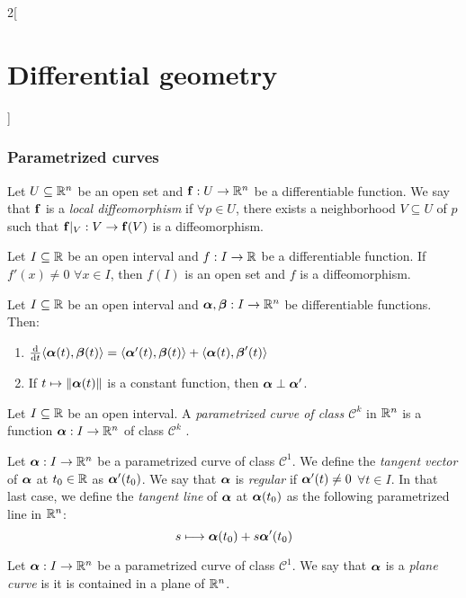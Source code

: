 \documentclass[../../../main.tex]{subfiles}
\begin{document}
\begin{multicols}{2}[\section{Differential geometry}]
  \subsubsection{Parametrized curves}
  \begin{definition}
    Let $U\subseteq\mathbb{R}^n$ be an open set and $\boldsymbol{\mathrm{f}}:U\rightarrow\mathbb{R}^n$ be a differentiable function. We say that $\boldsymbol{\mathrm{f}}$ is a \emph{local diffeomorphism} if $\forall p\in U$, there exists a neighborhood $V\subseteq U$ of $p$ such that $\boldsymbol{\mathrm{f}}|_V:V\rightarrow \boldsymbol{\mathrm{f}}(V)$ is a diffeomorphism.
  \end{definition}
  \begin{prop}
    Let $I\subseteq\mathbb{R}$ be an open interval and $f:I\rightarrow\mathbb{R}$ be a differentiable function. If $f'(x)\ne 0$ $\forall x\in I$, then $f(I)$ is an open set and $f$ is a diffeomorphism.
  \end{prop}
  \begin{prop}
    Let $I\subseteq\mathbb{R}$ be an open interval and $\boldsymbol{\mathrm{\alpha}},\boldsymbol{\mathrm{\beta}}:I\rightarrow\mathbb{R}^n$ be differentiable functions. Then:
    \begin{enumerate}
      \item $\dv{}{t}\langle\boldsymbol{\mathrm{\alpha}}(t),\boldsymbol{\mathrm{\beta}}(t)\rangle=\langle\boldsymbol{\mathrm{\alpha}}'(t),\boldsymbol{\mathrm{\beta}}(t)\rangle+\langle\boldsymbol{\mathrm{\alpha}}(t),\boldsymbol{\mathrm{\beta}}'(t)\rangle$
      \item If $t\mapsto\|\boldsymbol{\mathrm{\alpha}}(t)\|$ is a constant function, then $\boldsymbol{\mathrm{\alpha}}\perp\boldsymbol{\mathrm{\alpha}}'$.
    \end{enumerate}
  \end{prop}
  \begin{definition}
    Let $I\subseteq\mathbb{R}$ be an open interval. A \emph{parametrized curve of class $\mathcal{C}^k$} in $\mathbb{R}^n$ is a function $\boldsymbol{\mathrm{\alpha}}:I\rightarrow\mathbb{R}^n$ of class $\mathcal{C}^k$ .
  \end{definition}
  \begin{definition}
    Let $\boldsymbol{\mathrm{\alpha}}:I\rightarrow\mathbb{R}^n$ be a parametrized curve of class $\mathcal{C}^1$. We define the \emph{tangent vector} of $\boldsymbol{\mathrm{\alpha}}$ at $t_0\in\mathbb{R}$ as $\boldsymbol{\mathrm{\alpha}}'(t_0)$. We say that $\boldsymbol{\mathrm{\alpha}}$ is \emph{regular} if $\boldsymbol{\mathrm{\alpha}}'(t)\ne 0$ $\forall t\in I$. In that last case, we define the \emph{tangent line} of $\boldsymbol{\mathrm{\alpha}}$ at $\boldsymbol{\mathrm{\alpha}}(t_0)$ as the following parametrized line in $\mathbb{R}^n$: $$s\longmapsto \boldsymbol{\mathrm{\alpha}}(t_0)+s\boldsymbol{\mathrm{\alpha}}'(t_0)$$
  \end{definition}
  \begin{definition}
    Let $\boldsymbol{\mathrm{\alpha}}:I\rightarrow\mathbb{R}^n$ be a parametrized curve of class $\mathcal{C}^1$. We say that $\boldsymbol{\mathrm{\alpha}}$ is a \emph{plane curve} is it is contained in a plane of $\mathbb{R}^n$.

\end{definition}
\end{multicols}
\end{document}
